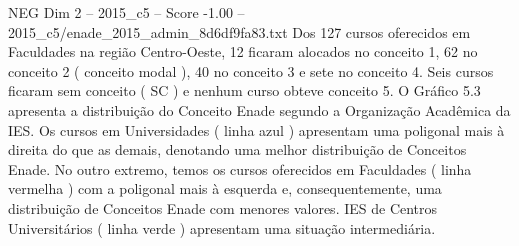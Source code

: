 \begin{textsample}{NEG Dim 2 – 2015\_c5 – Score -1.00 – 2015\_c5/enade\_2015\_admin\_8d6df9fa83.txt}
Dos 127 cursos oferecidos em Faculdades na região Centro-Oeste, 12 ficaram alocados no conceito 1, 62 no conceito 2 ( conceito modal ), 40 no conceito 3 e sete no conceito 4.
Seis cursos ficaram sem conceito ( SC ) e nenhum curso obteve conceito 5.
O Gráfico 5.3 apresenta a distribuição do Conceito Enade segundo a Organização Acadêmica da IES.
Os cursos em Universidades ( linha azul ) apresentam uma poligonal mais à direita do que as demais, denotando uma melhor distribuição de Conceitos Enade.
No outro extremo, temos os cursos oferecidos em Faculdades ( linha vermelha ) com a poligonal mais à esquerda e, consequentemente, uma distribuição de Conceitos Enade com menores valores.
IES de Centros Universitários ( linha verde ) apresentam uma situação intermediária.

\end{textsample}

